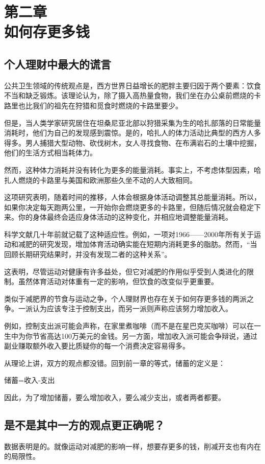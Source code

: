 \section[第二章\q 如何存更多钱]{第二章\\ 如何存更多钱}
\renewcommand{\bookchapter}{2}
\setcounter{figure}{0}
\setcounter{table}{0}
\subsection{个人理财中最大的谎言}
公共卫生领域的传统观点是，西方世界日益增长的肥胖主要归因于两个要素：饮食不当和缺乏锻炼。该理论认为，除了摄入高热量食物，我们坐在办公桌前燃烧的卡路里也比我们的祖先在狩猎和觅食时燃烧的卡路里要少。

但是，当人类学家研究居住在坦桑尼亚北部以狩猎采集为生的哈扎部落的日常能量消耗时，他们为自己的发现感到震惊。是的，哈扎人的体力活动比典型的西方人多得多。男人捕猎大型动物、砍伐树木，女人寻找食物、在布满岩石的土壤中挖掘，他们的生活方式相当耗体力。

然而，这种体力消耗并没有转化为更多的能量消耗。事实上，不考虑体型因素，哈扎人燃烧的卡路里与美国和欧洲那些久坐不动的人大致相同。

这项研究表明，随着时间的推移，人体会根据身体活动调整其总能量消耗。所以，如果你决定每天跑两公里，一开始你会燃烧更多的卡路里，但随后情况就会稳定下来。你的身体最终会适应身体活动的这种变化，并相应地调整能量消耗。

科学文献几十年前就记载了这种适应性。例如，一项对1966——2000年所有关于运动和减肥的研究发现，增加体育活动确实能在短期内消耗更多的脂肪。然而，“当回顾长期研究结果时，并没有发现二者的这种关系”。

这表明，尽管运动对健康有许多益处，但它对减肥的作用似乎受到人类进化的限制。虽然体育活动对体重有一定的影响，但饮食的改变似乎更重要。

类似于减肥界的节食与运动之争，个人理财界也存在关于如何存更多钱的两派之争。一派认为应该专注于控制支出，而另一派则声称应该努力增加收入。

例如，控制支出派可能会声称，在家里煮咖啡（而不是在星巴克买咖啡）可以在一生中为你节省高达100万美元的金钱。另一方面，增加收入派可能会争辩说，通过副业赚取额外收入要比质疑你的每一个消费决定容易得多。

从理论上讲，双方的观点都没错。回到前一章的等式，储蓄的定义是：

储蓄=收入-支出

因此，为了增加储蓄，要么增加收入，要么减少支出，或者两者都要。

\subsection{是不是其中一方的观点更正确呢？}
数据表明是的。就像运动对减肥的影响一样，想要存更多的钱，削减开支也有内在的局限性。

